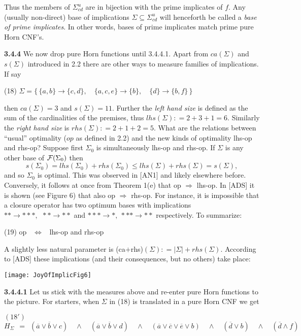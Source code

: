 \documentclass[11pt]{article}
\newcommand{\ol}{\overline}
\newcommand{\ra}{\rightarrow}
\newcommand{\Ra}{\Rightarrow}
\begin{document}
Thus the members of $\Sigma_{cd}^u$ are in bijection with the prime implicates of $f$. Any (usually non-direct) base of implications $\Sigma \subseteq \Sigma_{cd}^u$ will henceforth be called a {\it base of prime implicates}. In other words, bases of prime implicates match prime pure Horn CNF's.


{\bf 3.4.4} We now drop pure Horn functions until 3.4.4.1. Apart from $ca(\Sigma )$ and $s(\Sigma)$ introduced in 2.2 there are other ways to measure families of implications. If say

(18) \qquad $\Sigma = \{\, \{a,b\} \ra \{c,d\},\quad \{a, c, e\} \ra \{b\},\quad \{d\} \ra \{b,f\}\,\}$

then $ca(\Sigma) = 3$ and $s(\Sigma) = 11$. Further the {\it left hand size} is defined as the sum of the cardinalities of the premises, thus $lhs (\Sigma) : = 2+3+1 = 6$. Similarly the {\it right hand size} is $rhs(\Sigma) : = 2+1+2=5$. 
What are the relations between ``usual'' optimality ($op$ as defined in 2.2) and the new kinds of optimality lhs-op and rhs-op? Suppose first $\Sigma_0$ is simultaneously lhs-op and rhs-op. If $\Sigma$ is any other base of ${\cal F}(\Sigma_0)$ then
$$s(\Sigma_0) = lhs(\Sigma_0 ) + rhs(\Sigma_0) \leq lhs (\Sigma) + rhs (\Sigma) = s(\Sigma),$$
and so $\Sigma_0$ is optimal. This was observed in [AN1] and likely elsewhere before. Conversely, it follows at once from Theorem 1(e) that op $\Ra$ lhs-op. In [ADS] it is shown (see Figure 6) that also op $\Ra$ rhs-op.  For instance, it is impossible that a closure operator has two optimum bases with implications $\ast \ast \ra \ast \ast \ast, \ \ \ast \ast \ra \ast \ast$  and 
$\ast \ast \ast \ra \ast, \ \ast \ast \ast \ra \ast \ast$ respectively. To summarize:

(19) \qquad op \ $\Leftrightarrow$ \ lhs-op and rhs-op

A slightly less natural parameter is (ca$+$rhs)$(\Sigma) : = |\Sigma| + rhs(\Sigma)$. According to [ADS] these implications (and their consequences, but no others) take place:

\begin{center}
\texttt{[image: JoyOfImplicFig6]}
\end{center}

{\bf 3.4.4.1} Let us stick with the measures above and re-enter pure Horn functions to the picture. For starters, when $\Sigma$ in (18) is translated in a pure Horn CNF we get

$(18')$ \qquad $H_\Sigma \ \ = \ \  (\ol{a} \vee \ol{b} \vee c) \quad \wedge \quad (\ol{a} \vee \ol{b} \vee d) \quad \wedge \quad (\ol{a} \vee \ol{c} \vee \ol{e} \vee b) \quad \wedge \quad (\ol{d} \vee b) \quad \wedge \quad (\ol{d} \wedge f)$
\end{document}
